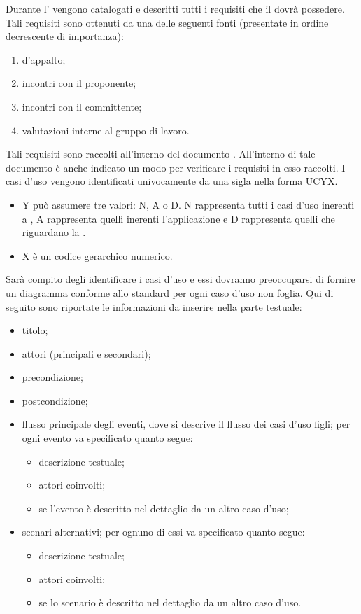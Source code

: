 		Durante l' vengono catalogati e descritti tutti i requisiti che il  dovrà possedere. Tali requisiti sono ottenuti da una delle seguenti fonti (presentate in ordine decrescente di importanza):
		\begin{enumerate}
			\item {} d’appalto;
			\item incontri con il proponente;
			\item incontri con il committente;
			\item valutazioni interne al gruppo di lavoro.
		\end{enumerate}
		Tali requisiti sono raccolti all'interno del documento . All'interno di tale documento è anche indicato un modo per verificare i requisiti in esso raccolti.
				 \label{sec:classificazioneUC}
				I casi d'uso vengono identificati univocamente da una sigla nella forma UCYX.
				\begin{itemize}
					\item Y può assumere tre valori: N, A o D. N rappresenta tutti i casi d'uso inerenti a , A rappresenta quelli inerenti l'applicazione  e D rappresenta quelli che riguardano la .
					\item X è un codice gerarchico numerico.
				\end{itemize}
				Sarà compito degli  identificare i casi d'uso e essi dovranno preoccuparsi di fornire un diagramma conforme allo standard  per ogni caso d'uso non foglia. Qui di seguito sono riportate le informazioni da inserire nella parte testuale:
				\begin{itemize}
					\item titolo;
					\item attori (principali e secondari);
					\item precondizione;
					\item postcondizione;
					\item flusso principale degli eventi, dove si descrive il flusso dei casi d'uso figli; per ogni evento va specificato quanto segue:
					\begin{itemize}
						\item descrizione testuale;
						\item attori coinvolti;
						\item se l’evento è descritto nel dettaglio da un altro caso d’uso;
					\end{itemize}
					\item scenari alternativi; per ognuno di essi va specificato quanto segue:
					\begin{itemize}
						\item descrizione testuale;
						\item attori coinvolti;
						\item se lo scenario è descritto nel dettaglio da un altro caso d’uso.
					\end{itemize}
				\end{itemize}
